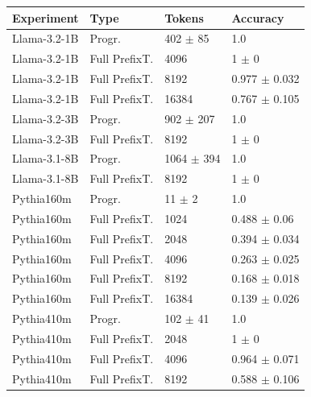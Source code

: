 \begin{tabular}{llll}
\toprule
 Experiment      & Type          & Tokens                  & Accuracy                   \\
\midrule
 \midrule
 Llama-3.2-1B         & Progr.        & 402 {\small $\pm$ 85}   & 1.0                        \\
 Llama-3.2-1B         & Full PrefixT. & 4096                    & 1 {\small $\pm$ 0}         \\
 Llama-3.2-1B         & Full PrefixT. & 8192                    & 0.977 {\small $\pm$ 0.032} \\
 Llama-3.2-1B         & Full PrefixT. & 16384                   & 0.767 {\small $\pm$ 0.105} \\
 \midrule
 Llama-3.2-3B         & Progr.        & 902 {\small $\pm$ 207}  & 1.0                        \\
 Llama-3.2-3B         & Full PrefixT. & 8192                    & 1 {\small $\pm$ 0}         \\
 \midrule
 Llama-3.1-8B         & Progr.        & 1064 {\small $\pm$ 394} & 1.0                        \\
 Llama-3.1-8B         & Full PrefixT. & 8192                    & 1 {\small $\pm$ 0}         \\
 \midrule
 Pythia160m          & Progr.        & 11 {\small $\pm$ 2}     & 1.0                        \\
 Pythia160m          & Full PrefixT. & 1024                    & 0.488 {\small $\pm$ 0.06}  \\
 Pythia160m          & Full PrefixT. & 2048                    & 0.394 {\small $\pm$ 0.034} \\
 Pythia160m          & Full PrefixT. & 4096                    & 0.263 {\small $\pm$ 0.025} \\
 Pythia160m          & Full PrefixT. & 8192                    & 0.168 {\small $\pm$ 0.018} \\
 Pythia160m          & Full PrefixT. & 16384                   & 0.139 {\small $\pm$ 0.026} \\
 \midrule
 Pythia410m          & Progr.        & 102 {\small $\pm$ 41}   & 1.0                        \\
 Pythia410m          & Full PrefixT. & 2048                    & 1 {\small $\pm$ 0}         \\
 Pythia410m          & Full PrefixT. & 4096                    & 0.964 {\small $\pm$ 0.071} \\
 Pythia410m          & Full PrefixT. & 8192                    & 0.588 {\small $\pm$ 0.106} \\

\end{tabular}
